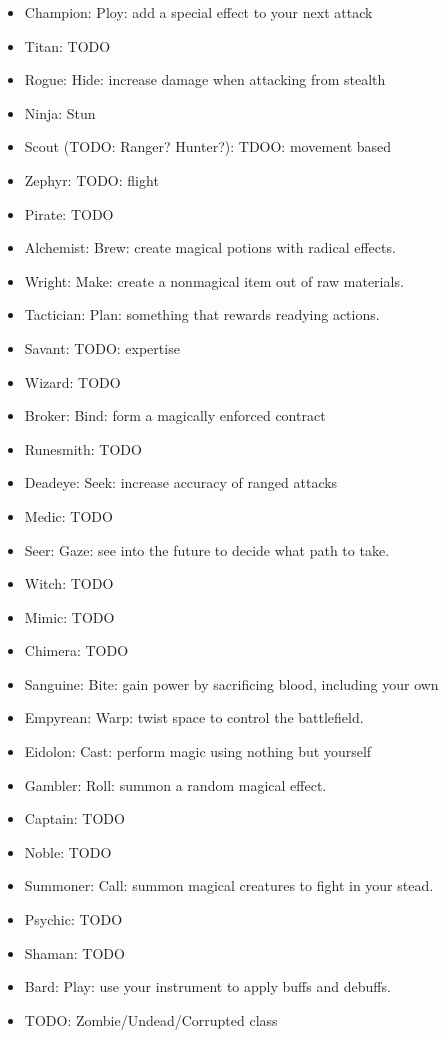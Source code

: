 \documentclass[12pt]{article}
\begin{document}
\begin{itemize}
\item Champion: Ploy: add a special effect to your next attack
\item Titan: TODO
\item Rogue: Hide: increase damage when attacking from stealth
\item Ninja: Stun
\item Scout (TODO: Ranger? Hunter?): TDOO: movement based
\item Zephyr: TODO: flight
\item Pirate: TODO
\item Alchemist: Brew: create magical potions with radical effects.
\item Wright: Make: create a nonmagical item out of raw materials.
\item Tactician: Plan: something that rewards readying actions.
\item Savant: TODO: expertise
\item Wizard: TODO
\item Broker: Bind: form a magically enforced contract
\item Runesmith: TODO
\item Deadeye: Seek: increase accuracy of ranged attacks
\item Medic: TODO
\item Seer: Gaze: see into the future to decide what path to take.
\item Witch: TODO
\item Mimic: TODO
\item Chimera: TODO
\item Sanguine: Bite: gain power by sacrificing blood, including your own
\item Empyrean: Warp: twist space to control the battlefield.
\item Eidolon: Cast: perform magic using nothing but yourself
\item Gambler: Roll: summon a random magical effect.
\item Captain: TODO
\item Noble: TODO
\item Summoner: Call: summon magical creatures to fight in your stead.
\item Psychic: TODO
\item Shaman: TODO
\item Bard: Play: use your instrument to apply buffs and debuffs.
\item TODO: Zombie/Undead/Corrupted class
\end{itemize}
\end{document}
